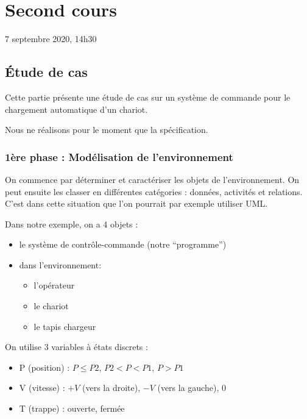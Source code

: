 \section{Second cours}

7 septembre 2020, 14h30

\hypertarget{uxe9tude-de-cas}{%
\subsection{Étude de cas}\label{uxe9tude-de-cas}}

Cette partie présente une étude de cas sur un système de commande pour
le chargement automatique d'un chariot.

Nous ne réalisons pour le moment que la spécification.

\hypertarget{uxe8re-phase-moduxe9lisation-de-lenvironnement}{%
\subsubsection{1ère phase : Modélisation de
l'environnement}\label{uxe8re-phase-moduxe9lisation-de-lenvironnement}}

On commence par déterminer et caractériser les objets de
l'environnement. On peut ensuite les classer en différentes catégories :
données, activités et relations. C'est dans cette situation que l'on
pourrait par exemple utiliser UML.

Dans notre exemple, on a 4 objets :

\begin{itemize}
\tightlist
\item
  le système de contrôle-commande (notre ``programme'')
\item
  dans l'environnement:

  \begin{itemize}
  \tightlist
  \item
    l'opérateur
  \item
    le chariot
  \item
    le tapis chargeur
  \end{itemize}
\end{itemize}

On utilise 3 variables à états discrets :

\begin{itemize}
\tightlist
\item
  P (position) : \(P \leq P2\), \(P2 < P < P1\),
  \(P > P1\)
\item
  V (vitesse) : \(+V\) (vers la droite), \(-V\) (vers la gauche), 0
\item
  T (trappe) : ouverte, fermée
\end{itemize}

